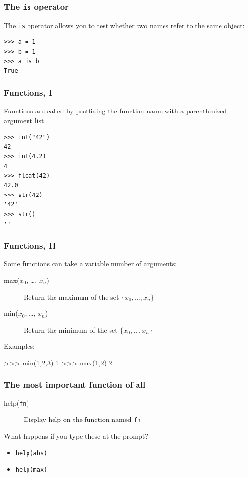 \documentclass[english,serif,mathserif,xcolor=pdftex,dvipsnames,table]{beamer}
\begin{document}
\begin{frame}[fragile]
  \frametitle{The \texttt{is} operator}

  The \texttt{is} operator allows you to test whether two names refer
  to the same object:
\begin{lstlisting}
>>> a = 1
>>> b = 1
>>> a is b
True
\end{lstlisting}

\end{frame}


\begin{frame}[fragile,label=func1]
  \frametitle{Functions, I}
  Functions are called by postfixing the function name with a
  parenthesized argument list.

  \+
\begin{lstlisting}
>>> int("42")
42
>>> int(4.2)
4
>>> float(42)
42.0
>>> str(42)
'42'
>>> str()
''
\end{lstlisting}

  \hyperlink{typeconv}{}
\end{frame}


\begin{frame}[fragile]
  \frametitle{Functions, II}
  Some functions can take a variable number of arguments:
  \begin{description}
    \item[max($x_0$, \ldots, $x_n$)] Return the maximum of the set $\{ x_0, \ldots, x_n \}$
    \item[min($x_0$, \ldots, $x_n$)] Return the minimum of the set $\{ x_0, \ldots, x_n \}$
  \end{description}

  \+
  Examples:
\begin{semiverbatim}
>>> min(1,2,3)
1
>>> max(1,2)
2
\end{semiverbatim}
\end{frame}


\begin{frame}[fragile]
  \frametitle{The most important function of all}
  \begin{description}
  \item[help(\texttt{fn})] Display help on the function named \texttt{fn}
  \end{description}

  \+
  \begin{question}
    What happens if you type these at the prompt?
    \begin{itemize}
    \item \texttt{help(abs)}
    \item \texttt{help(max)}
    \end{itemize}
  \end{question}
\end{frame}
\end{document}
